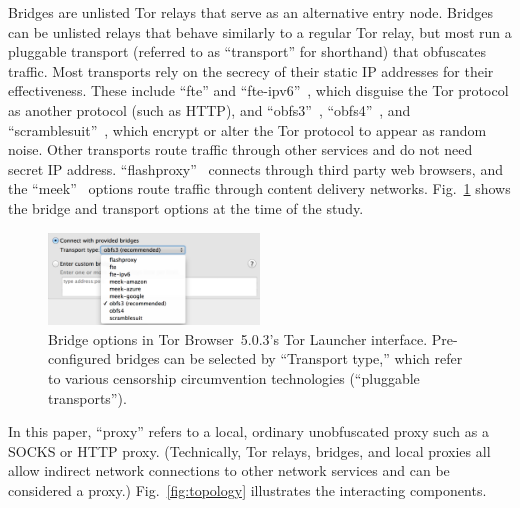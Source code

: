 \documentclass[USenglish,oneside,twocolumn]{article}
\begin{document}
Bridges are unlisted Tor relays that serve as an alternative entry node.
Bridges can be unlisted relays that behave similarly to a regular Tor relay,  
but most run a pluggable transport (referred to as ``transport'' for shorthand) that obfuscates traffic. 
Most transports rely on the secrecy of their static IP addresses for their effectiveness.
These include ``fte'' and ``fte-ipv6''~\cite{fte},
which disguise the Tor protocol as another protocol (such as HTTP), and
``obfs3''~\cite{obfs3}, ``obfs4''~\cite{obfs4}, and ``scramblesuit''~\cite{scramblesuit},
which encrypt or alter the Tor protocol to appear as random noise.
Other transports route traffic through other services and do not need secret IP address. 
``flashproxy''~\cite{flashproxy} connects through third party web browsers,
and the ``meek''~\cite{fifield2015blocking} options route traffic
through content delivery networks. Fig.~\ref{fig:bridge-options} shows the bridge and transport options at the time of the study.

\begin{figure}
  \centering
    \includegraphics[width=0.5\textwidth]{bridge-options.png}
\caption{
Bridge options in Tor Browser~5.0.3's Tor Launcher interface.
Pre-configured bridges can be selected by ``Transport type,'' which refer to various
censorship circumvention technologies (``pluggable transports'').
}
\label{fig:bridge-options}
\end{figure}

In this paper, ``proxy'' refers to a local, ordinary unobfuscated proxy such as a SOCKS or HTTP proxy. (Technically, Tor relays, bridges, and local proxies all allow indirect network connections to other network services and can be considered a proxy.) Fig.~\ref{fig:topology} illustrates the interacting components.
\end{document}
